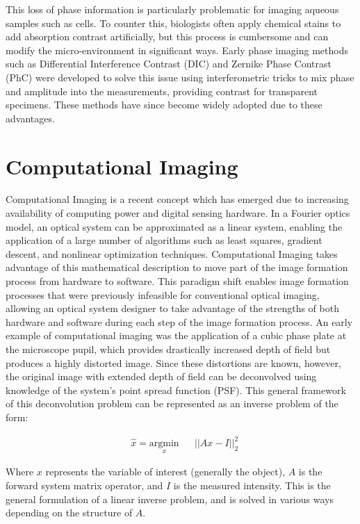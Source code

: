 This loss of phase information is particularly problematic for imaging aqueous samples such as cells. To counter this, biologists often apply chemical stains to add absorption contrast artificially, but this process is cumbersome and can modify the micro-environment in significant ways. Early phase imaging methods such as Differential Interference Contrast (DIC)\cite{smithDIC} and Zernike Phase Contrast (PhC) \cite{zernike1955discovered} were developed to solve this issue using interferometric tricks to mix phase and amplitude into the measurements, providing contrast for transparent specimens. These methods have since become widely adopted due to these advantages.

\section{Computational Imaging}
Computational Imaging is a recent concept which has emerged due to increasing availability of computing power and digital sensing hardware. In a Fourier optics model, an optical system can be approximated as a linear system, enabling the application of a large number of algorithms such as least squares, gradient descent, and nonlinear optimization techniques. Computational Imaging takes advantage of this mathematical description to move part of the image formation process from hardware to software. This paradigm shift enables image formation processes that were previously infeasible for conventional optical imaging, allowing an optical system designer to take advantage of the strengths of both hardware and software during each step of the image formation process.  An early example of computational imaging was the application of a cubic phase plate at the microscope pupil, which provides drastically increased depth of field but produces a highly distorted image. Since these distortions are known, however, the original image with extended depth of field can be deconvolved using knowledge of the system's point spread function (PSF)\cite{Dowski:95}. This general framework of this deconvolution problem can be represented as an inverse problem of the form:

\begin{equation}
\begin{aligned}
& \hat{x} = \underset{x}{\text{argmin}}
& & ||Ax-I ||_2^2
\end{aligned}
\end{equation}

Where $x$ represents the variable of interest (generally the object), $A$ is the forward system matrix operator, and $I$ is the measured intensity. This is the general formulation of a linear inverse problem, and is solved in various ways depending on the structure of $A$. 

